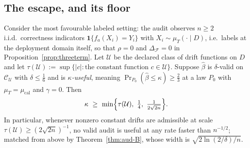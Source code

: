 \subsection{The escape, and its floor}

\begin{theorem}\label{thm:lecam}
Consider the most favourable labeled setting: the audit observes $n\ge2$ i.i.d.\ correctness
indicators $\mathbf 1\{f_a(X_i)=Y_i\}$ with $X_i\sim\mu_T(\cdot\mid D)$, i.e.\ labels at the
deployment domain itself, so that $\rho=0$ and $\Delta_{\mathcal F}=0$ in
Proposition~\ref{prop:threeterm}. Let $\mathcal U$ be the declared class of drift functions
on $D$ and let $\tau(\mathcal U):=\sup\{|c|:\text{the constant function }c\in\mathcal U\}$.
Suppose $\widehat\beta$ is $\delta$-valid on $\mathcal C_{\mathcal U}$ with $\delta\le\tfrac16$
and is \emph{$\kappa$-useful}, meaning $\Pr_{P_0}(\widehat\beta\le\kappa)\ge\tfrac23$ at a law
$P_0$ with $\mu_T=\mu_{\mathrm{cal}}$ and $\gamma=0$. Then
\[
\kappa\ \ge\ \min\Bigl\{\tau(\mathcal U),\ \tfrac{1}{4},\ \tfrac{1}{2\sqrt{2n}}\Bigr\}.
\]
In particular, whenever nonzero constant drifts are admissible at scale
$\tau(\mathcal U)\ge(2\sqrt{2n})^{-1}$, no valid audit is useful at any rate faster than
$n^{-1/2}$; matched from above by Theorem~\ref{thm:aud-B}, whose width is
$\sqrt{2\ln(2/\delta)/n}$.
\end{theorem}
